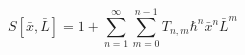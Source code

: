 \begin{equation}%
S[\bar{x}, \bar{L}] = 1 + \sum_{n=1}^\infty \sum_{m=0}^{n-1} T_{n,m} \hbar^n \bar{x}^n \bar{L}^m
\end{equation}

